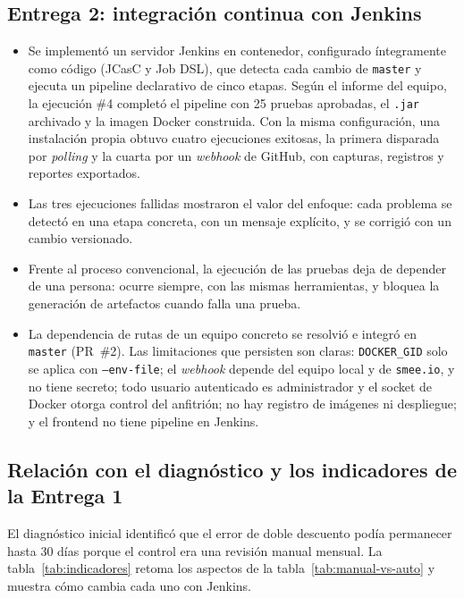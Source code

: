\documentclass[11pt,a4paper]{article}
\begin{document}
\subsection{Entrega 2: integración continua con Jenkins}

\begin{itemize}
  \item Se implementó un servidor Jenkins en contenedor, configurado íntegramente como código (JCasC
        y Job DSL), que detecta cada cambio de \texttt{master} y ejecuta un pipeline declarativo de
        cinco etapas. Según el informe del equipo, la ejecución \#4 completó el pipeline con 25
        pruebas aprobadas, el \texttt{.jar} archivado y la imagen Docker construida. Con la misma
        configuración, una instalación propia obtuvo cuatro ejecuciones exitosas, la primera
        disparada por \emph{polling} y la cuarta por un \emph{webhook} de GitHub, con capturas,
        registros y reportes exportados.
  \item Las tres ejecuciones fallidas mostraron el valor del enfoque: cada problema se detectó en una
        etapa concreta, con un mensaje explícito, y se corrigió con un cambio versionado.
  \item Frente al proceso convencional, la ejecución de las pruebas deja de depender de una persona:
        ocurre siempre, con las mismas herramientas, y bloquea la generación de artefactos cuando
        falla una prueba.
  \item La dependencia de rutas de un equipo concreto se resolvió e integró en \texttt{master}
        (PR~\#2). Las limitaciones que persisten son claras: \texttt{DOCKER\_GID} solo se aplica con
        \texttt{--env-file}; el \emph{webhook} depende del equipo local y de \texttt{smee.io}, y no
        tiene secreto; todo usuario autenticado es
        administrador y el socket de Docker otorga
        control del anfitrión; no hay registro de imágenes ni despliegue; y el frontend no tiene
        pipeline en Jenkins.
\end{itemize}

\subsection{Relación con el diagnóstico y los indicadores de la Entrega 1}

El diagnóstico inicial identificó que el error de doble descuento podía permanecer hasta 30 días
porque el control era una revisión manual mensual. La tabla~\ref{tab:indicadores} retoma los aspectos
de la tabla~\ref{tab:manual-vs-auto} y muestra cómo cambia cada uno con Jenkins.
\end{document}
